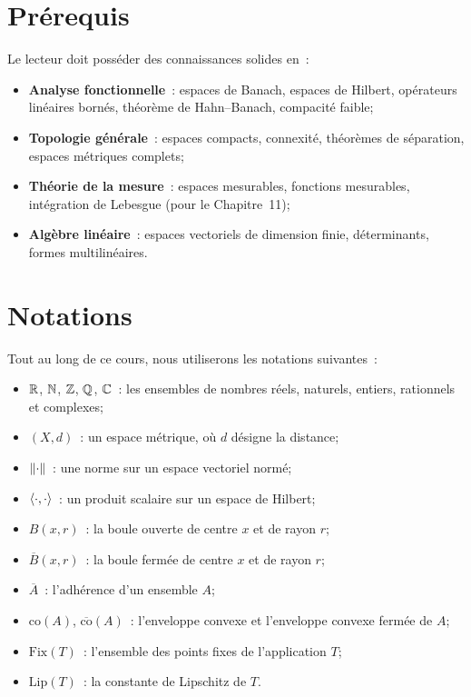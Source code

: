 \section*{Pr\'erequis}

Le lecteur doit poss\'eder des connaissances solides en~:
\begin{itemize}
    \item \textbf{Analyse fonctionnelle}~: espaces de Banach, espaces de Hilbert,
          op\'erateurs lin\'eaires born\'es, th\'eor\`eme de Hahn--Banach, compacit\'e
          faible;
    \item \textbf{Topologie g\'en\'erale}~: espaces compacts, connexit\'e,
          th\'eor\`emes de s\'eparation, espaces m\'etriques complets;
    \item \textbf{Th\'eorie de la mesure}~: espaces mesurables, fonctions mesurables,
          int\'egration de Lebesgue (pour le Chapitre~11);
    \item \textbf{Alg\`ebre lin\'eaire}~: espaces vectoriels de dimension finie,
          d\'eterminants, formes multilin\'eaires.
\end{itemize}

\section*{Notations}

Tout au long de ce cours, nous utiliserons les notations suivantes~:
\begin{itemize}
    \item $\mathbb{R}$, $\mathbb{N}$, $\mathbb{Z}$, $\mathbb{Q}$, $\mathbb{C}$~: les ensembles de nombres r\'eels,
          naturels, entiers, rationnels et complexes;
    \item $(X, d)$~: un espace m\'etrique, o\`u $d$ d\'esigne la distance;
    \item $\left\| \cdot \right\|$~: une norme sur un espace vectoriel norm\'e;
    \item $\langle \cdot, \cdot \rangle$~: un produit scalaire sur un espace de Hilbert;
    \item $B(x, r)$~: la boule ouverte de centre $x$ et de rayon $r$;
    \item $\overline{B}(x, r)$~: la boule ferm\'ee de centre $x$ et de rayon $r$;
    \item $\overline{A}$~: l'adh\'erence d'un ensemble $A$;
    \item $\mathrm{co}(A)$, $\overline{\mathrm{co}}(A)$~: l'enveloppe convexe et
          l'enveloppe convexe ferm\'ee de $A$;
    \item $\mathrm{Fix}(T)$~: l'ensemble des points fixes de l'application $T$;
    \item $\mathrm{Lip}(T)$~: la constante de Lipschitz de $T$.
\end{itemize}

